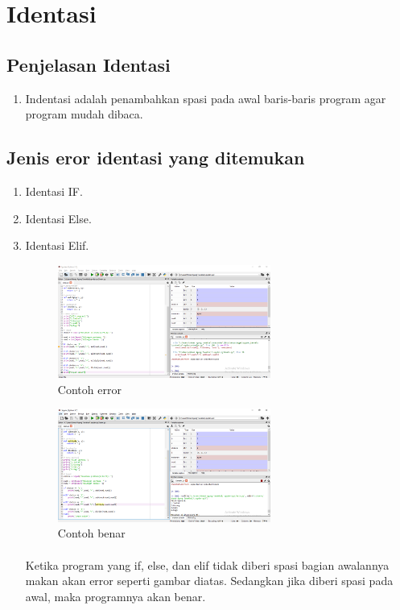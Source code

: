 \documentclass{article}
\begin{document}
\section{Identasi}

\subsection{Penjelasan Identasi}
    \begin{enumerate}
        \item Indentasi adalah penambahkan spasi pada awal baris-baris program agar program mudah dibaca.
    \end{enumerate}

\subsection{Jenis eror identasi yang ditemukan} 
    \begin{enumerate}
        \item Identasi IF.
        \item Identasi Else.
        \item Identasi Elif.
            \begin{figure}[ht]
                \centerline{\includegraphics[width=7cm]{gambar3.PNG}}
                \caption{Contoh error}
            \end{figure}
            \begin{figure}[ht]
                \centerline{\includegraphics[width=7cm]{gambar4.PNG}}
                \caption{Contoh benar}
            \end{figure}
                \paragraph{}Ketika program yang if, else, dan elif tidak diberi spasi bagian awalannya makan akan error seperti gambar diatas. Sedangkan jika diberi spasi pada awal, maka programnya akan benar.
                
    \end{enumerate}
    
\end{document}
